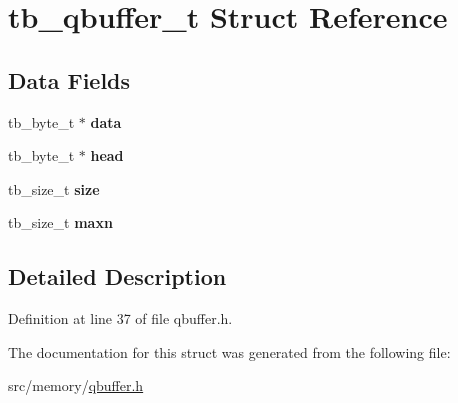 \hypertarget{structtb__qbuffer__t}{\section{tb\-\_\-qbuffer\-\_\-t Struct Reference}
\label{structtb__qbuffer__t}
}
\subsection*{Data Fields}
\begin{DoxyCompactItemize}
\item 
\hypertarget{structtb__qbuffer__t_af7eaf540fe32eecf49f3fce95c8508c6}{tb\-\_\-byte\-\_\-t $\ast$ {\bfseries data}}\label{structtb__qbuffer__t_af7eaf540fe32eecf49f3fce95c8508c6}

\item 
\hypertarget{structtb__qbuffer__t_a96c41c030eb5382cbdce5217b2f86bce}{tb\-\_\-byte\-\_\-t $\ast$ {\bfseries head}}\label{structtb__qbuffer__t_a96c41c030eb5382cbdce5217b2f86bce}

\item 
\hypertarget{structtb__qbuffer__t_a7d8efe3494fdaa2bd1b05c7b33a80413}{tb\-\_\-size\-\_\-t {\bfseries size}}\label{structtb__qbuffer__t_a7d8efe3494fdaa2bd1b05c7b33a80413}

\item 
\hypertarget{structtb__qbuffer__t_a4c170d1a6982e8eed8a74c0d182938ef}{tb\-\_\-size\-\_\-t {\bfseries maxn}}\label{structtb__qbuffer__t_a4c170d1a6982e8eed8a74c0d182938ef}

\end{DoxyCompactItemize}


\subsection{Detailed Description}


Definition at line 37 of file qbuffer.\-h.



The documentation for this struct was generated from the following file\-:\begin{DoxyCompactItemize}
\item 
src/memory/\hyperlink{qbuffer_8h}{qbuffer.\-h}\end{DoxyCompactItemize}
